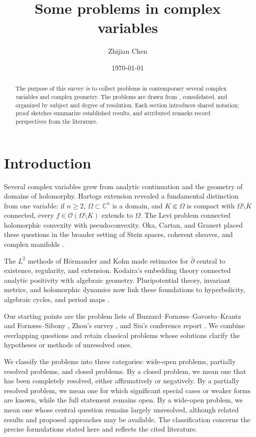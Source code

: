 \documentclass[11pt,reqno]{amsart}
\title{Some problems in complex variables}
\author{Zhijian Chen}
\date{\today}
\theoremstyle{definition}
\theoremstyle{remark}
\begin{document}
\begin{abstract}
The purpose of this survey is to collect problems in contemporary several complex variables and complex geometry. The problems are drawn from \cite{B95,FS2001,Zhou2019,Siu2025}, consolidated, and organized by subject and degree of resolution. Each section introduces shared notation; proof sketches summarize established results, and attributed remarks record perspectives from the literature.
\end{abstract}
\maketitle

\section*{Introduction}
Several complex variables grew from analytic continuation and the geometry of domains of holomorphy. Hartogs extension revealed a fundamental distinction from one variable: if $n\geq2$, $\Omega\subset\mathbb C^n$ is a domain, and $K\Subset\Omega$ is compact with $\Omega\setminus K$ connected, every $f\in\mathcal O(\Omega\setminus K)$ extends to $\Omega$. The Levi problem connected holomorphic convexity with pseudoconvexity. Oka, Cartan, and Grauert placed these questions in the broader setting of Stein spaces, coherent sheaves, and complex manifolds \cite{B95,FS2001,Zhou2019}.

The $L^2$ methods of H\"ormander and Kohn made estimates for $\bar\partial$ central to existence, regularity, and extension. Kodaira's embedding theory connected analytic positivity with algebraic geometry. Pluripotential theory, invariant metrics, and holomorphic dynamics now link these foundations to hyperbolicity, algebraic cycles, and period maps \cite{Zhou2019,Siu2025}.

Our starting points are the problem lists of Buzzard--Forn\ae ss--Gavosto--Krantz \cite{B95} and Forn\ae ss--Sibony \cite{FS2001}, Zhou's survey \cite{Zhou2019}, and Siu's conference report \cite{Siu2025}. We combine overlapping questions and retain classical problems whose solutions clarify the hypotheses or methods of unresolved ones.

We classify the problems into three categories: wide-open problems, partially resolved problems, and closed problems. By a closed problem, we mean one that has been completely resolved, either affirmatively or negatively. By a partially resolved problem, we mean one for which significant special cases or weaker forms are known, while the full statement remains open. By a wide-open problem, we mean one whose central question remains largely unresolved, although related results and proposed approaches may be available. The classification concerns the precise formulations stated here and reflects the cited literature.
\end{document}
